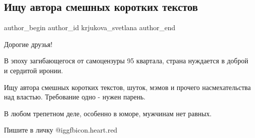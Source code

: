  
 
 
 
 
 
\subsection{Ищу автора смешных коротких текстов}
\label{sec:04_12_2021.fb.krjukova_svetlana.1.avtor_poisk}
 
\ifcmt
 author_begin
   author_id krjukova_svetlana
 author_end
\fi

Дорогие друзья! 

В эпоху загибающегося от самоцензуры 95 квартала, страна нуждается в доброй и
сердитой иронии. 

Ищу автора смешных коротких текстов, шуток, мэмов и прочего насмехательства над
властью. Требование одно - нужен парень. 

В любом трепетном деле, особенно в юморе,  мужчинам нет равных. 

Пишите в личку @igg{fbicon.heart.red}
